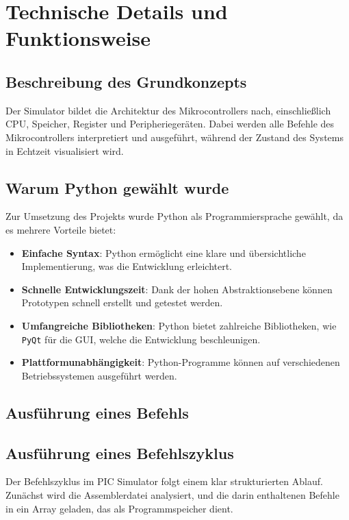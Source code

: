 \documentclass[a4paper,11pt]{report}
\begin{document}
\chapter{Technische Details und Funktionsweise}

\section{Beschreibung des Grundkonzepts}
Der Simulator bildet die Architektur des Mikrocontrollers nach, einschließlich CPU, Speicher, Register und Peripheriegeräten. Dabei werden alle Befehle des Mikrocontrollers interpretiert und ausgeführt, während der Zustand des Systems in Echtzeit visualisiert wird.

\section{Warum Python gewählt wurde}
Zur Umsetzung des Projekts wurde Python als Programmiersprache gewählt, da es mehrere Vorteile bietet:
\begin{itemize}
    \item \textbf{Einfache Syntax}: Python ermöglicht eine klare und übersichtliche Implementierung, was die Entwicklung erleichtert.
    \item \textbf{Schnelle Entwicklungszeit}: Dank der hohen Abstraktionsebene können Prototypen schnell erstellt und getestet werden.
    \item \textbf{Umfangreiche Bibliotheken}: Python bietet zahlreiche Bibliotheken, wie \texttt{PyQt} für die GUI, welche die Entwicklung beschleunigen.
    \item \textbf{Plattformunabhängigkeit}: Python-Programme können auf verschiedenen Betriebssystemen ausgeführt werden.
\end{itemize}

\section{Ausführung eines Befehls}

\section{Ausführung eines Befehlszyklus}

Der Befehlszyklus im PIC Simulator folgt einem klar strukturierten Ablauf. Zunächst wird die Assemblerdatei analysiert, und die darin enthaltenen Befehle in ein Array geladen, das als Programmspeicher dient. 
\end{document}
